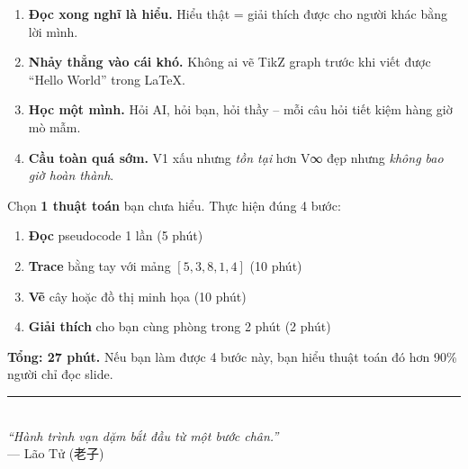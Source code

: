 \documentclass[11pt]{article}
\begin{document}
\vspace{0.5cm}

\begin{mistakebox}
\begin{enumerate}[leftmargin=1.5em, itemsep=3pt]
  \item \textbf{Đọc xong nghĩ là hiểu.} Hiểu thật = giải thích được cho người khác bằng lời mình.
  \item \textbf{Nhảy thẳng vào cái khó.} Không ai vẽ TikZ graph trước khi viết được ``Hello World'' trong \LaTeX{}.
  \item \textbf{Học một mình.} Hỏi AI, hỏi bạn, hỏi thầy -- mỗi câu hỏi tiết kiệm hàng giờ mò mẫm.
  \item \textbf{Cầu toàn quá sớm.} V1 xấu nhưng \textit{tồn tại} hơn V∞ đẹp nhưng \textit{không bao giờ hoàn thành}.
\end{enumerate}
\end{mistakebox}

\vspace{0.5cm}

\begin{tipbox}
Chọn \textbf{1 thuật toán} bạn chưa hiểu. Thực hiện đúng 4 bước:

\begin{enumerate}[leftmargin=1.5em, itemsep=3pt]
  \item \textbf{Đọc} pseudocode 1 lần (5 phút)
  \item \textbf{Trace} bằng tay với mảng $[5, 3, 8, 1, 4]$ (10 phút)
  \item \textbf{Vẽ} cây hoặc đồ thị minh họa (10 phút)
  \item \textbf{Giải thích} cho bạn cùng phòng trong 2 phút (2 phút)
\end{enumerate}

\textbf{Tổng: 27 phút.} Nếu bạn làm được 4 bước này, bạn hiểu thuật toán đó hơn 90\% người chỉ đọc slide.
\end{tipbox}

\vspace{1cm}
\begin{center}
\rule{0.5\linewidth}{0.5pt}\\[0.3cm]
{\itshape ``Hành trình vạn dặm bắt đầu từ một bước chân.''}\\[0.2cm]
{\small --- Lão Tử (老子)}
\end{center}
\end{document}
